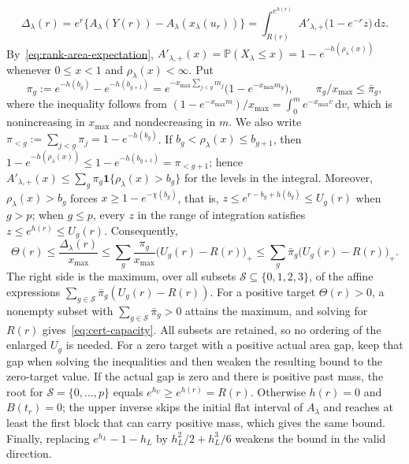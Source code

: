 \documentclass[11pt]{article}
\theoremstyle{definition}
\theoremstyle{remark}
\newcommand{\Pp}{\mathbb P}
\newcommand{\dd}{\,\mathrm d}
\newcommand{\ind}{\mathbf 1}
\begin{document}
\[
 \Delta_\lambda(r)=e^r\bigl\{A_\lambda(Y(r))-A_\lambda(x_\lambda(u_r))\bigr\}
 =\int_{R(r)}^{e^{h(r)}}A'_{\lambda,+}\bigl(1-e^{-r}z\bigr)\dd z.
\]
By~\eqref{eq:rank-area-expectation}, $A'_{\lambda,+}(x)=\Pp(X_\lambda\le x)=1-e^{-h(\rho_\lambda(x))}$
whenever $0\le x<1$ and $\rho_\lambda(x)<\infty$. Put
\[
 \pi_g:=e^{-h(b_g)}-e^{-h(b_{g+1})}=e^{-x_{\max}\sum_{j<g}m_j}\bigl(1-e^{-x_{\max}m_g}\bigr),
 \qquad \pi_g/x_{\max}\le\bar\pi_g,
\]
where the inequality follows from
$(1-e^{-x_{\max} m})/x_{\max}=\int_0^m e^{-x_{\max} v}\dd v$, which is nonincreasing in
$x_{\max}$ and nondecreasing in $m$. We also write $\pi_{<g}:=\sum_{j<g}\pi_j=1-e^{-h(b_g)}$.
If $b_g<\rho_\lambda(x)\le b_{g+1}$, then $1-e^{-h(\rho_\lambda(x))}\le1-e^{-h(b_{g+1})}
=\pi_{<g+1}$; hence $A'_{\lambda,+}(x)\le\sum_g\pi_g\ind\{\rho_\lambda(x)>b_g\}$
for the levels in the integral. Moreover, $\rho_\lambda(x)>b_g$ forces
$x\ge1-e^{-\chi(b_g)}$, that is, $z\le e^{r-b_g+h(b_g)}\le U_g(r)$ when $g>p$; when $g\le p$,
every $z$ in the range of integration satisfies $z\le e^{h(r)}\le U_g(r)$. Consequently,
\[
 \Theta(r)\le\frac{\Delta_\lambda(r)}{x_{\max}}
 \le\sum_g\frac{\pi_g}{x_{\max}}\bigl(U_g(r)-R(r)\bigr)_+
 \le\sum_g\bar\pi_g\bigl(U_g(r)-R(r)\bigr)_+.
\]
The right side is the maximum, over all subsets $\mathcal S\subseteq\{0,1,2,3\}$, of the affine
expressions $\sum_{g\in\mathcal S}\bar\pi_g(U_g(r)-R(r))$. For a positive target $\Theta(r)>0$,
a nonempty subset with $\sum_{g\in\mathcal S}\bar\pi_g>0$ attains the maximum, and solving for
$R(r)$ gives~\eqref{eq:cert-capacity}. All subsets are retained, so no ordering of the
enlarged $U_g$ is needed.
For a zero target with a positive actual area gap, keep that gap when solving the
inequalities and then weaken the resulting bound to the zero-target value. If the actual gap
is zero and there is positive past mass, the root for $\mathcal S=\{0,\ldots,p\}$ equals
$e^{h_U}\ge e^{h(r)}=R(r)$. Otherwise $h(r)=0$ and $B(t_r)=0$; the upper inverse skips the
initial flat interval of $A_\lambda$ and reaches at least the first block that can carry
positive mass, which gives the same bound. Finally, replacing $e^{h_L}-1-h_L$ by
$h_L^2/2+h_L^3/6$ weakens the bound in the valid direction.
\end{document}
